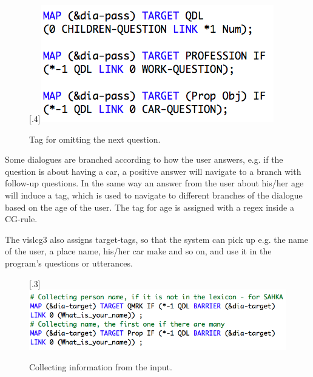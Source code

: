 \documentclass[11pt]{article}
\begin{document}
\begin{figure}%
\begin{center}
\scalebox{.4}[.4]{\includegraphics{presentation/img/pass_rules.png}}\\
\caption{Tag for omitting the next question. 
}
\end{center}
\end{figure}

 
 
Some dialogues are branched according to how the user answers, e.g. if the question is about having a car, a positive answer will navigate to a branch with follow-up questions. In the same way an answer from the user about his/her age will induce a tag, which is used to navigate to different branches of the dialogue based on the age of the user. The tag for age is assigned with a regex inside a CG-rule.

The vislcg3 also assigns target-tags, so that the system can pick up e.g. the name of the user, a place name, his/her car make and so on, and use it in the program's questions or utterances.

\begin{figure}%
\begin{center}
\scalebox{.3}[.3]{\includegraphics{presentation/img/picking_name_new.png}}\\
\caption{Collecting information from the input. 
}
\end{center}
\end{figure}
\end{document}
